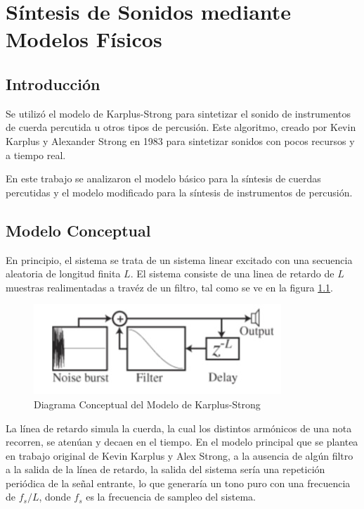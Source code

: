 \chapter{Síntesis de Sonidos mediante Modelos Físicos}

\section{Introducción}
Se utilizó el modelo de Karplus-Strong para sintetizar el sonido de instrumentos de cuerda percutida u otros tipos de percusión. Este algoritmo, creado por Kevin Karplus y Alexander Strong en 1983 para sintetizar sonidos con pocos recursos y a tiempo real.

En este trabajo se analizaron el modelo básico para la síntesis de cuerdas percutidas y el modelo modificado para la síntesis de instrumentos de percusión.

\section{Modelo Conceptual}

En principio, el sistema se trata de un sistema linear excitado con una secuencia aleatoria de longitud finita $L$. El sistema consiste de una linea de retardo de $L$ muestras realimentadas a travéz de un filtro, tal como se ve en la figura \ref{fig:KS_model}.

\begin{figure}[ht]
    \centering
    \includegraphics{res/ks_concept.jpg}
    \caption{Diagrama Conceptual del Modelo de Karplus-Strong}
    \label{fig:KS_model}
\end{figure}

La línea de retardo simula la cuerda, la cual los distintos armónicos de una nota recorren, se atenúan y decaen en el tiempo. En el modelo principal que se plantea en trabajo original de Kevin Karplus y Alex Strong, a la ausencia de algún filtro a la salida de la línea de retardo, la salida del sistema sería una repetición periódica de la señal entrante, lo que generaría un tono puro con una frecuencia de $f_s / L$, donde $f_s$ es la frecuencia de sampleo del sistema.

